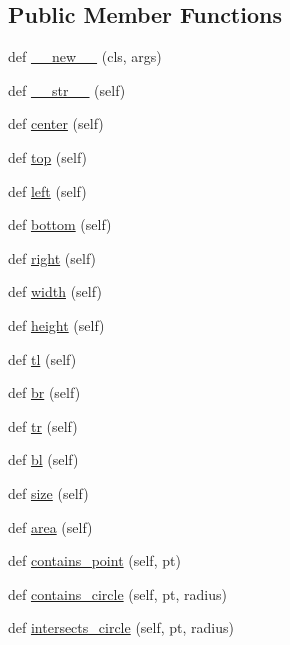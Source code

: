 \subsection*{Public Member Functions}
\begin{DoxyCompactItemize}
\item 
def \mbox{\hyperlink{classpysc2_1_1lib_1_1point_1_1_rect_affb16559d64650cec93cd02f448c71d2}{\+\_\+\+\_\+new\+\_\+\+\_\+}} (cls, args)
\item 
def \mbox{\hyperlink{classpysc2_1_1lib_1_1point_1_1_rect_a3a6542b97c3101008cd499a000460054}{\+\_\+\+\_\+str\+\_\+\+\_\+}} (self)
\item 
def \mbox{\hyperlink{classpysc2_1_1lib_1_1point_1_1_rect_a82cab19de96eaed9dd5be49049ec0693}{center}} (self)
\item 
def \mbox{\hyperlink{classpysc2_1_1lib_1_1point_1_1_rect_a3c193d3779c6b119d270800b7e17dd3e}{top}} (self)
\item 
def \mbox{\hyperlink{classpysc2_1_1lib_1_1point_1_1_rect_a0a8927452de661789c8f9deb83a6789a}{left}} (self)
\item 
def \mbox{\hyperlink{classpysc2_1_1lib_1_1point_1_1_rect_ad7b038b56a1f3e8a1a92e3838912b328}{bottom}} (self)
\item 
def \mbox{\hyperlink{classpysc2_1_1lib_1_1point_1_1_rect_aa79fc85774685f1efe137064583f4f99}{right}} (self)
\item 
def \mbox{\hyperlink{classpysc2_1_1lib_1_1point_1_1_rect_a98073512dd39e8597eadcc72c2dfe788}{width}} (self)
\item 
def \mbox{\hyperlink{classpysc2_1_1lib_1_1point_1_1_rect_a061a0ec9b597355317015b647f730bb0}{height}} (self)
\item 
def \mbox{\hyperlink{classpysc2_1_1lib_1_1point_1_1_rect_ab24b464cf19b24fd4cefa3f709a54e06}{tl}} (self)
\item 
def \mbox{\hyperlink{classpysc2_1_1lib_1_1point_1_1_rect_a511508b661f4ccd695c0b2c977364433}{br}} (self)
\item 
def \mbox{\hyperlink{classpysc2_1_1lib_1_1point_1_1_rect_a5277829d3eca9056290854276660769c}{tr}} (self)
\item 
def \mbox{\hyperlink{classpysc2_1_1lib_1_1point_1_1_rect_aef68c28b9f99cbc10bc9f2276b6fde79}{bl}} (self)
\item 
def \mbox{\hyperlink{classpysc2_1_1lib_1_1point_1_1_rect_a22e5621c8f853ee62bee5d206a5d5ef9}{size}} (self)
\item 
def \mbox{\hyperlink{classpysc2_1_1lib_1_1point_1_1_rect_a8518222f7f161ff6ddfc5de381e81803}{area}} (self)
\item 
def \mbox{\hyperlink{classpysc2_1_1lib_1_1point_1_1_rect_a3284effee8183e33f55f4744fb064fe2}{contains\+\_\+point}} (self, pt)
\item 
def \mbox{\hyperlink{classpysc2_1_1lib_1_1point_1_1_rect_a80a7f8bdd7ca0d737e082fa835a03a4d}{contains\+\_\+circle}} (self, pt, radius)
\item 
def \mbox{\hyperlink{classpysc2_1_1lib_1_1point_1_1_rect_a5d5843a9913820b8efca7dc21dfb0bd1}{intersects\+\_\+circle}} (self, pt, radius)
\end{DoxyCompactItemize}


